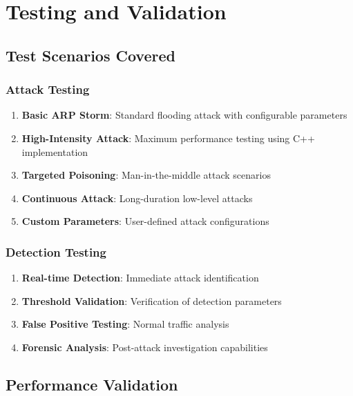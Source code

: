 \documentclass[12pt,a4paper]{article}
\begin{document}
\section{Testing and Validation}

\subsection{Test Scenarios Covered}

\subsubsection{Attack Testing}
\begin{enumerate}
    \item \textbf{Basic ARP Storm}: Standard flooding attack with configurable parameters
    \item \textbf{High-Intensity Attack}: Maximum performance testing using C++ implementation
    \item \textbf{Targeted Poisoning}: Man-in-the-middle attack scenarios
    \item \textbf{Continuous Attack}: Long-duration low-level attacks
    \item \textbf{Custom Parameters}: User-defined attack configurations
\end{enumerate}

\subsubsection{Detection Testing}
\begin{enumerate}
    \item \textbf{Real-time Detection}: Immediate attack identification
    \item \textbf{Threshold Validation}: Verification of detection parameters
    \item \textbf{False Positive Testing}: Normal traffic analysis
    \item \textbf{Forensic Analysis}: Post-attack investigation capabilities
\end{enumerate}

\subsection{Performance Validation}
\end{document}
